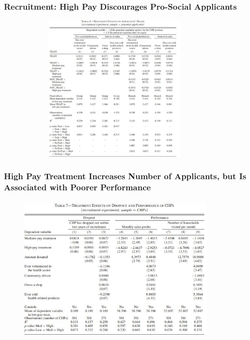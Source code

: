 \documentclass{beamer}
\begin{document}
\begin{frame}
\frametitle{Recruitment: High Pay Discourages Pro-Social Applicants}
\begin{figure}
    \includegraphics[width=10cm,height=7.5cm]{Deserranno_Table4} 
     \end{figure}






\end{frame}
\begin{frame}
\frametitle{High Pay Treatment Increases Number of Applicants, but Is Associated with Poorer Performance}
\begin{figure}
    \includegraphics[width=10cm,height=7.5cm]{Deserranno_Table7} 
     \end{figure}



\end{frame}
\end{document}
